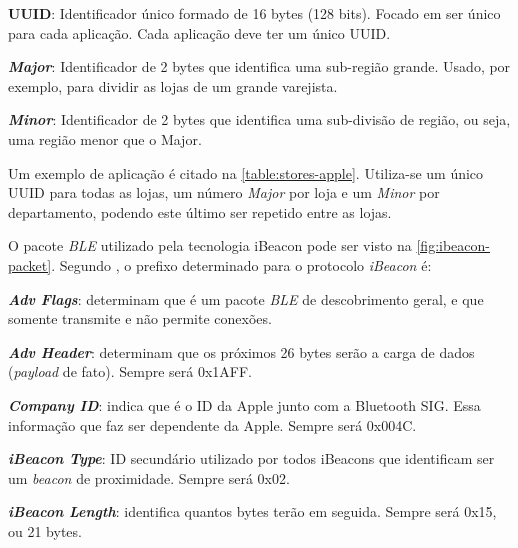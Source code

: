 \begin{alineas}
	\item \textbf{UUID}: Identificador único formado de 16 bytes (128 bits). Focado em ser único para cada aplicação. Cada aplicação deve ter um único UUID.
	\item \textbf{\textit{Major}}: Identificador de 2 bytes que identifica uma sub-região grande. Usado, por exemplo, para dividir as lojas de um grande varejista.
	\item \textbf{\textit{Minor}}: Identificador de 2 bytes que identifica uma sub-divisão de região, ou seja, uma região menor que o Major.
\end{alineas}

Um exemplo de aplicação é citado na \autoref{table:stores-apple}. Utiliza-se um único UUID para todas as lojas, um número \textit{Major} por loja e um \textit{Minor} por departamento, podendo este último ser repetido entre as lojas.

\begin{table}[htb]
\end{table}

O pacote \textit{BLE} utilizado pela tecnologia iBeacon pode ser visto na \autoref{fig:ibeacon-packet}. Segundo , o prefixo determinado para o protocolo \textit{iBeacon} é:

\begin{alineas}
	\item \textit{\textbf{Adv Flags}}: determinam que é um pacote \textit{BLE} de descobrimento geral, e que somente transmite e não permite conexões.
	\item \textit{\textbf{Adv Header}}: determinam que os próximos 26 bytes serão a carga de dados (\textit{payload} de fato). Sempre será 0x1AFF.
	\item \textit{\textbf{Company ID}}: indica que é o ID da Apple junto com a Bluetooth SIG. Essa informação que faz ser dependente da Apple. Sempre será 0x004C.
	\item\textit{\textbf{iBeacon Type}}: ID secundário utilizado por todos iBeacons que identificam ser um \textit{beacon} de proximidade. Sempre será 0x02.
	\item\textit{\textbf{iBeacon Length}}: identifica quantos bytes terão em seguida. Sempre será 0x15, ou 21 bytes.
\end{alineas}

